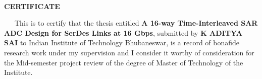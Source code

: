 
\newpage

\thispagestyle{empty}
{~} %
\vspace{10em} %
\begin{center}
	\textbf{\Large CERTIFICATE}
\end{center}
~~~This is to certify that the thesis entitled  \textbf{A 16-way Time-Interleaved SAR ADC Design for SerDes Links at 16 Gbps}, submitted by \textbf{K ADITYA SAI} to Indian Institute of Technology  Bhubaneswar, is a record of bonafide research work under my supervision and I consider it worthy of consideration for the Mid-semester project review of the degree of Master of Technology of the Institute.

